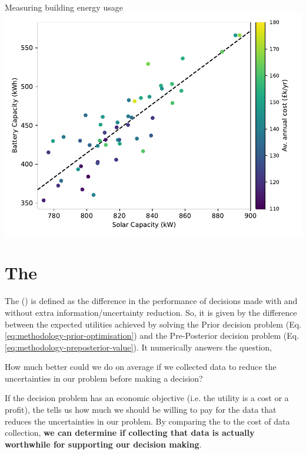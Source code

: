 \begin{ebox}[label=ebox:bayes]{Measuring building energy usage}
    {
        \centering
        \includegraphics[width=0.75\linewidth]{Methodology/Figs/posterior_designs.pdf}
        \vspace*{-0.25cm}
        \label{fig:methodology-example-post-designs}
    }
    \bigskip

\end{ebox}

\newpage
\section{The } \label{sec:methodology-voi}

The  () is defined as the difference in the performance of decisions made with and without extra information/uncertainty reduction. So, it is given by the difference between the expected utilities achieved by solving the Prior decision problem (Eq. \ref{eq:methodology-prior-optimisation}) and the Pre-Posterior decision problem (Eq. \ref{eq:methodology-preposterior-value}).
It numerically answers the question,
\begin{cbox}[colback=Aquamarine!10!white]{}
How much better could we do on average if we collected data to reduce the uncertainties in our problem before making a decision?
\end{cbox}
\vspace{0.2cm}

\noindent
If the decision problem has an economic objective (i.e. the utility is a cost or a profit), the  tells us how much we should be willing to pay for the data that reduces the uncertainties in our problem. By comparing the  to the cost of data collection, \textbf{we can determine if collecting that data is actually worthwhile for supporting our decision making}.\

